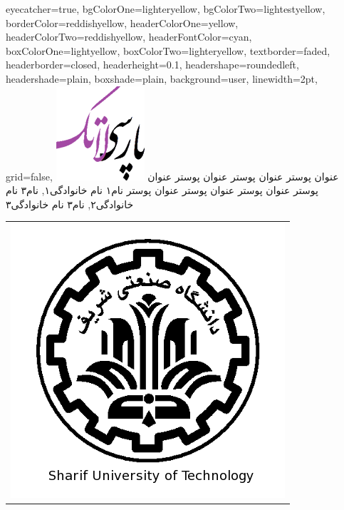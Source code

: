 \documentclass[debug,a0paper,portrait]{xebaposter}
\begin{document}
      \begin{poster}%
      {
      eyecatcher=true,
      bgColorOne=lighteryellow,
      bgColorTwo=lightestyellow,
      borderColor=reddishyellow,
      headerColorOne=yellow,
      headerColorTwo=reddishyellow,
      headerFontColor=cyan,
      boxColorOne=lightyellow,
      boxColorTwo=lighteryellow,
      textborder=faded,
      headerborder=closed,
      headerheight=0.1\textheight,
      headershape=roundedleft,
      headershade=plain,
      boxshade=plain,
      background=user,
      linewidth=2pt,
      grid=false,
      }
 {
      \includegraphics[height=0.07\textheight]{logo}
 }
 {عنوان پوستر عنوان پوستر عنوان پوستر عنوان پوستر عنوان پوستر عنوان پوستر عنوان پوستر 
}
 {\large نام۱ نام خانوادگی۱, نام۳ نام خانوادگی۲, نام۳ نام خانوادگی۳ 
 \\%
 {\normalsize\texttt{}}}
 {
\begin{tabular}{r}
    \includegraphics[height=0.07 \textheight]{shariflogo}\\
\end{tabular}
 }


\end{poster}
\end{document}
